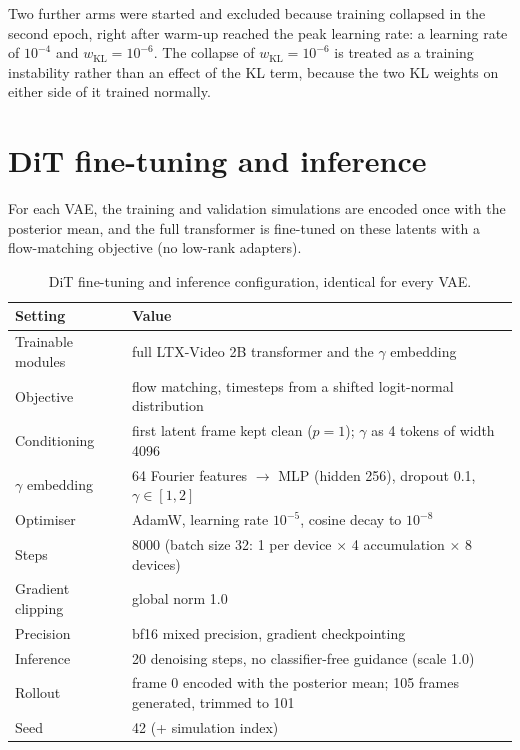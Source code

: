 Two further arms were started and excluded because training collapsed in the
second epoch, right after warm-up reached the peak learning rate: a learning
rate of $10^{-4}$ and $w_\mathrm{KL}=10^{-6}$. The collapse of $w_\mathrm{KL}=10^{-6}$
is treated as a training instability rather than an effect of the KL term,
because the two KL weights on either side of it trained normally.

\section{DiT fine-tuning and inference}
\label{app:setup_dit}

For each VAE, the training and validation simulations are encoded once with the
posterior mean, and the full transformer is fine-tuned on these latents with a
flow-matching objective (no low-rank adapters).

\begin{table}[htbp]
\centering
\small
\caption{DiT fine-tuning and inference configuration, identical for every VAE.}
\label{tab:app_dit_hparams}
\begin{tabular}{ll}
\toprule
Setting & Value \\
\midrule
Trainable modules & full LTX-Video 2B transformer and the $\gamma$ embedding \\
Objective & flow matching, timesteps from a shifted logit-normal distribution \\
Conditioning & first latent frame kept clean ($p=1$); $\gamma$ as 4 tokens of width 4096 \\
$\gamma$ embedding & 64 Fourier features $\to$ MLP (hidden 256), dropout 0.1, $\gamma\in[1,2]$ \\
Optimiser & AdamW, learning rate $10^{-5}$, cosine decay to $10^{-8}$ \\
Steps & 8000 (batch size 32: 1 per device $\times$ 4 accumulation $\times$ 8 devices) \\
Gradient clipping & global norm 1.0 \\
Precision & bf16 mixed precision, gradient checkpointing \\
\midrule
Inference & 20 denoising steps, no classifier-free guidance (scale 1.0) \\
Rollout & frame 0 encoded with the posterior mean; 105 frames generated, trimmed to 101 \\
Seed & 42 (+ simulation index) \\
\bottomrule
\end{tabular}
\end{table}

